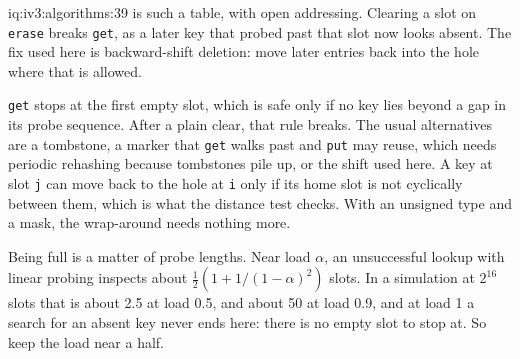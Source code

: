 \begin{solution}{iq:iv3:algorithms:39}
 is such a table, with open addressing. Clearing a slot on \texttt{erase} breaks \texttt{get}, as a later key that probed past that slot now looks absent. The fix used here is backward-shift deletion: move later entries back into the hole where that is allowed.
\label{lst:iv3:al:flatmap}

\texttt{get} stops at the first empty slot, which is safe only if no key lies beyond a gap in its probe sequence. After a plain clear, that rule breaks. The usual alternatives are a tombstone, a marker that \texttt{get} walks past and \texttt{put} may reuse, which needs periodic rehashing because tombstones pile up, or the shift used here. A key at slot \texttt{j} can move back to the hole at \texttt{i} only if its home slot is not cyclically between them, which is what the distance test checks. With an unsigned type and a mask, the wrap-around needs nothing more.

Being full is a matter of probe lengths. Near load $\alpha$, an unsuccessful lookup with linear probing inspects about $\frac{1}{2}(1 + 1/(1 - \alpha)^2)$ slots. In a simulation at $2^{16}$ slots that is about 2.5 at load 0.5, and about 50 at load 0.9, and at load 1 a search for an absent key never ends here: there is no empty slot to stop at. So keep the load near a half.

\end{solution}

